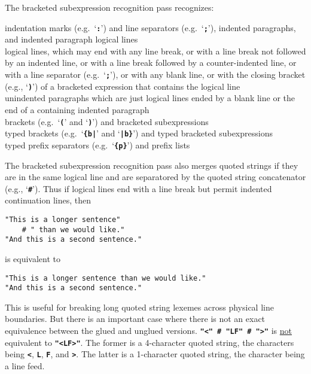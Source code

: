 \documentclass[12pt]{article}
\newcommand{\TT}[1]{{\tt \bfseries #1}}
\newenvironment{indpar}[1][0.3in]%
	{\begin{list}{}%
		     {\setlength{\itemsep}{0in}%
		      \setlength{\topsep}{0in}%
		      \setlength{\parsep}{1ex}%
		      \setlength{\labelwidth}{#1}%
		      \setlength{\leftmargin}{#1}%
		      \addtolength{\leftmargin}{\labelsep}}%
	 \item}%
	{\end{list}}
\begin{document}
The bracketed subexpression recognition pass recognizes:
\begin{indpar}[0.5in]
\hspace*{-0.2in}indentation marks (e.g.~`\TT{:}')
    and line separators (e.g.~`\TT{;}'),
    indented paragraphs, and indented paragraph logical lines \\
\hspace*{-0.2in}logical lines, which may end with any line break,
    or with a line break not followed by an indented line,
    or with a line break followed by a counter-indented line,
    or with a line separator (e.g.~`\TT{;}'),
    or with any blank line, or with the closing bracket
    (e.g., `\TT{)}') of
    a bracketed expression that contains the logical line \\
\hspace*{-0.2in}unindented paragraphs
    which are just logical lines ended by a blank line or
    the end of a containing indented paragraph \\
\hspace*{-0.2in}brackets (e.g.~`\TT{(}' and `\TT{)}')
    and bracketed subexpressions \\
\hspace*{-0.2in}typed brackets (e.g.~`\TT{\{b|}' and `\TT{|b\}}')
      and typed bracketed subexpressions \\
\hspace*{-0.2in}typed prefix separators (e.g.~`\TT{\{p\}}')
      and prefix lists
\end{indpar}

The bracketed subexpression recognition pass also merges
quoted strings if they are in the same logical line and are
separatored by the quoted string concatenator (e.g., `\TT{\#}').
Thus if logical lines end with a line break
but permit indented continuation lines, then
\begin{indpar}\begin{verbatim}
"This is a longer sentence"
    # " than we would like."
"And this is a second sentence."
\end{verbatim}\end{indpar}
is equivalent to
\begin{indpar}\begin{verbatim}
"This is a longer sentence than we would like."
"And this is a second sentence."
\end{verbatim}\end{indpar}
This is useful for
breaking long quoted string lexemes across physical line boundaries.
But there is an important case where there is not an exact equivalence
between the glued and unglued versions.  \TT{"<" \# "LF" \# ">"} is
\underline{not} equivalent to \TT{"<LF>"}.  The former is a 4-character
quoted string, the characters being \TT{<}, \TT{L}, \TT{F},
and \TT{>}.  The latter is a 1-character quoted string, the character
being a line feed.
\end{document}
